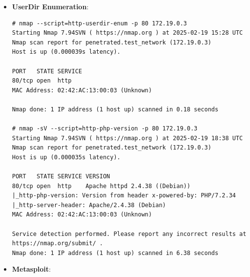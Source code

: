 \documentclass[12pt]{article}
\begin{document}
\begin{itemize}
\begin{itemize}
\begin{lstlisting}[label=shell, basicstyle=\tiny]
HTTP/1.1 200 OK
Date: Wed, 19 Feb 2025 15:01:38 GMT
Server: Apache/2.4.38 (Debian)
X-Powered-By: PHP/7.2.34
Vary: Accept-Encoding
Content-Length: 903
Content-Type: text/html; charset=UTF-8

<!DOCTYPE html>
<html lang="en">
<head>
    <meta charset="UTF-8">
    <title>Michelangelo</title>
    <link rel="stylesheet" href="https://maxcdn.bootstrapcdn.com/bootstrap/3.3.7/css/bootstrap.css">
    <style type="text/css">
        body{ font: 14px sans-serif; text-align: center; }
    </style>
</head>
    <body style="background-color:#f3f3f3;">
    <div>
        <div class="page-header">
        <img src="/mic.png" alt="Michelangelo" width="10%">
        <h1>
            Michelangelo
        </h1>
        </div>
        <div>
        <div>
            <p>
                <h2>We are a peaceful, honest car dealer</h2>
            </p>
            <p>
                <a href="./login.php" class="btn btn-primary">Enter your private area</a>
                <a href="./catalog.php" class="btn btn-primary">Check our vehicle catalog</a>
            </p>
        </div>
        </div>
    </div>
    </body>
</html>
Connection closed by foreign host.
            \end{lstlisting}
            \item \textbf{UserDir Enumeration}:
            \begin{lstlisting}[label=shell, basicstyle=\tiny]
# nmap --script=http-userdir-enum -p 80 172.19.0.3
Starting Nmap 7.94SVN ( https://nmap.org ) at 2025-02-19 15:28 UTC
Nmap scan report for penetrated.test_network (172.19.0.3)
Host is up (0.000039s latency).

PORT   STATE SERVICE
80/tcp open  http
MAC Address: 02:42:AC:13:00:03 (Unknown)

Nmap done: 1 IP address (1 host up) scanned in 0.18 seconds

# nmap -sV --script=http-php-version -p 80 172.19.0.3
Starting Nmap 7.94SVN ( https://nmap.org ) at 2025-02-19 18:38 UTC
Nmap scan report for penetrated.test_network (172.19.0.3)
Host is up (0.000035s latency).

PORT   STATE SERVICE VERSION
80/tcp open  http    Apache httpd 2.4.38 ((Debian))
|_http-php-version: Version from header x-powered-by: PHP/7.2.34
|_http-server-header: Apache/2.4.38 (Debian)
MAC Address: 02:42:AC:13:00:03 (Unknown)

Service detection performed. Please report any incorrect results at https://nmap.org/submit/ .
Nmap done: 1 IP address (1 host up) scanned in 6.38 seconds
            \end{lstlisting} 
            \item \textbf{Metasploit}: 
            \begin{lstlisting}[label=shell, basicstyle=\tiny]


\end{lstlisting}
\end{itemize}
\end{itemize}
\end{document}
